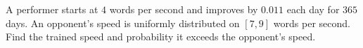 A performer starts at $4$ words per second and improves by $0.011$ each day for $365$ days. An opponent's speed is uniformly distributed on $[7,9]$ words per second. Find the trained speed and probability it exceeds the opponent's speed.
